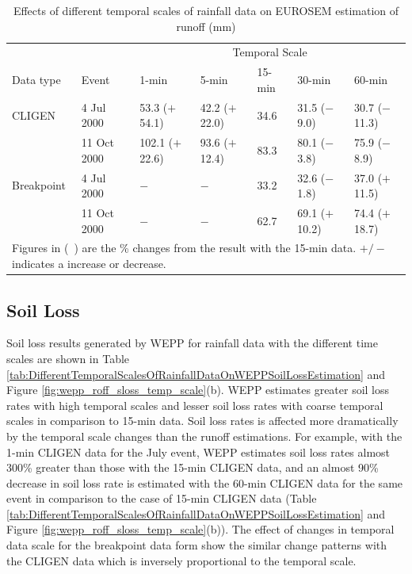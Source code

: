 \begin{table}[htbp]
  \centering
  \footnotesize
  \caption[Effects of different temporal scales of rainfall data on EUROSEM
estimation of runoff]{Effects of different temporal scales of rainfall data on
EUROSEM estimation of runoff (mm)}
\label{tab:DifferentTemporalScalesOfRainfallDataOnEUROSEMRunoffEstimation}
    \begin{tabular}{lllllll}
      \toprule
      & & \multicolumn{5}{c}{Temporal Scale}\\
      \cmidrule{3-7}
      Data type & Event & 1-min & 5-min & 15-min & 30-min & 60-min \\
      \midrule
      CLIGEN & 4 Jul 2000 & 53.3 ($+$54.1) & 42.2 ($+$22.0) & 34.6 & 31.5
($-$9.0) & 30.7 ($-$11.3) \\
       & 11 Oct 2000 & 102.1 ($+$22.6) & 93.6 ($+$12.4) & 83.3 & 80.1 ($-$3.8) &
75.9 ($-$8.9) \\
       \midrule
      Breakpoint & 4 Jul 2000 & $-$ & $-$ & 33.2 & 32.6 ($-$1.8) & 37.0
($+$11.5) \\
       & 11 Oct 2000 & $-$ & $-$ & 62.7 & 69.1 ($+$10.2) & 74.4 ($+$18.7)\\
      \bottomrule
      \multicolumn{7}{p{12cm}}{\footnotesize Figures in (\ ) are the \% changes
from the result with the 15-min data. $+/-$ indicates a increase or decrease.}\\
    \end{tabular}
\end{table}

\subsection{Soil Loss}
\label{sec:TemporalScalesSimulatedSoilLoss}

Soil loss results generated by WEPP for rainfall data with the different time
scales are shown in Table
\ref{tab:DifferentTemporalScalesOfRainfallDataOnWEPPSoilLossEstimation} and
Figure \ref{fig:wepp_roff_sloss_temp_scale}(b). WEPP estimates greater soil loss
rates with high temporal scales and lesser soil loss rates with coarse temporal
scales in comparison to 15-min data.
Soil loss rates is affected more dramatically by the temporal scale changes
than the runoff estimations. For example, with the 1-min CLIGEN
data for the July event, WEPP estimates soil loss rates almost 300\%
greater than those with the 15-min CLIGEN data, and an almost 90\% decrease in
soil loss rate is estimated with the 60-min CLIGEN data for the same event in
comparison to the case of 15-min CLIGEN data (Table
\ref{tab:DifferentTemporalScalesOfRainfallDataOnWEPPSoilLossEstimation} and
Figure \ref{fig:wepp_roff_sloss_temp_scale}(b)). The effect of changes in
temporal data scale for the breakpoint data form show the similar change
patterns with the CLIGEN data which is inversely proportional to the temporal
scale.

